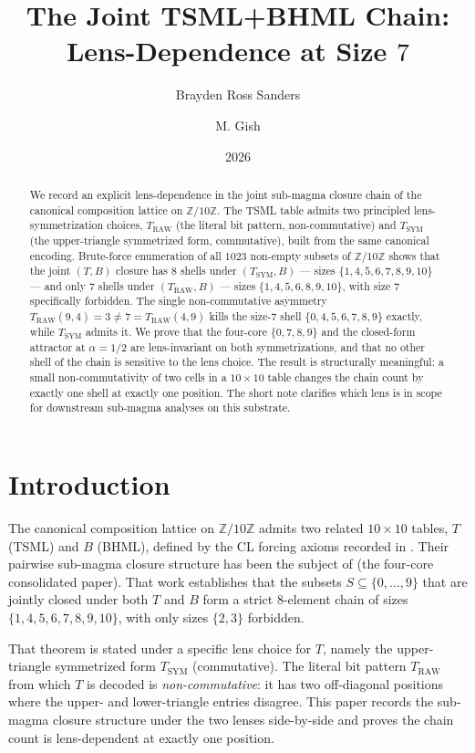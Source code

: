 \documentclass[11pt,reqno]{amsart}
\title[Lens-Dependence of the TSML+BHML Joint Chain]
  {The Joint TSML+BHML Chain:\\
   Lens-Dependence at Size $7$}
\author{Brayden Ross Sanders}
\author{M. Gish}
\date{2026}
\theoremstyle{definition}
\newcommand{\Z}{\mathbb{Z}}
\newcommand{\TRAW}{T_{\mathrm{RAW}}}
\newcommand{\TSYM}{T_{\mathrm{SYM}}}
\newcommand{\TSML}{T}
\newcommand{\BHML}{B}
\begin{document}
\begin{abstract}
We record an explicit lens-dependence in the joint sub-magma closure
chain of the canonical composition lattice on $\Z/10\Z$. The TSML
table admits two principled lens-symmetrization choices,
$\TRAW$ (the literal bit pattern, non-commutative) and $\TSYM$
(the upper-triangle symmetrized form, commutative), built from the
same canonical encoding. Brute-force enumeration of all $1023$
non-empty subsets of $\Z/10\Z$ shows that the joint
$(\TSML, \BHML)$ closure has $8$ shells under
$(\TSYM, \BHML)$ — sizes $\{1, 4, 5, 6, 7, 8, 9, 10\}$ — and only
$7$ shells under $(\TRAW, \BHML)$ — sizes $\{1, 4, 5, 6, 8, 9, 10\}$,
with size $7$ specifically forbidden. The single non-commutative
asymmetry $\TRAW(9, 4) = 3 \neq 7 = \TRAW(4, 9)$ kills the size-$7$
shell $\{0, 4, 5, 6, 7, 8, 9\}$ exactly, while $\TSYM$ admits it.
We prove that the four-core $\{0, 7, 8, 9\}$ and the closed-form
attractor at $\alpha = 1/2$ are lens-invariant on both
symmetrizations, and that no other shell of the chain is sensitive
to the lens choice. The result is structurally meaningful: a small
non-commutativity of two cells in a $10 \times 10$ table changes
the chain count by exactly one shell at exactly one position. The
short note clarifies which lens is in scope for downstream
sub-magma analyses on this substrate.
\end{abstract}

\maketitle

\section{Introduction}
\label{sec:intro}

The canonical composition lattice on $\Z/10\Z$ admits two related
$10 \times 10$ tables, $\TSML$ (TSML) and $\BHML$ (BHML), defined
by the CL forcing axioms recorded in \cite{Sanders2026CLAxioms}.
Their pairwise sub-magma closure structure has been the subject of
\cite{Sanders2026FourCore} (the four-core consolidated paper). That
work establishes that the subsets $S \subseteq \{0, \ldots, 9\}$
that are jointly closed under both $\TSML$ and $\BHML$ form a
strict $8$-element chain of sizes $\{1, 4, 5, 6, 7, 8, 9, 10\}$,
with only sizes $\{2, 3\}$ forbidden.

That theorem is stated under a specific lens choice for $\TSML$,
namely the upper-triangle symmetrized form $\TSYM$ (commutative).
The literal bit pattern $\TRAW$ from which $\TSML$ is decoded is
\emph{non-commutative}: it has two off-diagonal positions where the
upper- and lower-triangle entries disagree. This paper records the
sub-magma closure structure under the two lenses side-by-side and
proves the chain count is lens-dependent at exactly one position.
\end{document}
